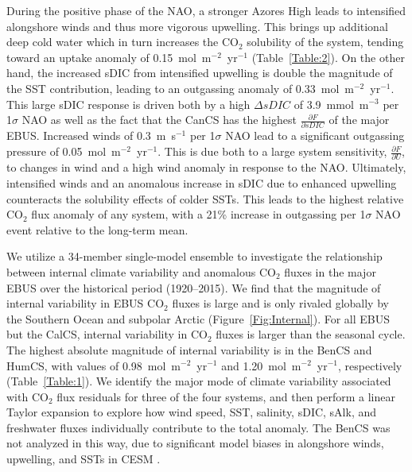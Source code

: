 \documentclass[hvmath, online,bgd]{copernicus_discussions}
\begin{document}
During the positive phase of the NAO, a stronger Azores High leads to intensified alongshore winds and thus more vigorous upwelling. This brings up additional deep cold water which in turn increases the CO$_{2}$ solubility of the system, tending toward an uptake anomaly of 0.15~mol~m$^{-2}$~yr$^{-1}$ (Table~\ref{Table:2}). On the other hand, the increased sDIC from intensified upwelling is double the magnitude of the SST contribution, leading to an outgassing anomaly of 0.33~mol~m$^{-2}$~yr$^{-1}$. This large sDIC response is driven both by a high $\Delta sDIC$ of 3.9~mmol~m$^{-3}$ per 1$\sigma$ NAO as well as the fact that the CanCS has the highest $\frac{\partial F}{\partial sDIC}$ of the major EBUS. Increased winds of 0.3~m~s$^{-1}$ per 1$\sigma$ NAO lead to a significant outgassing pressure of 0.05~mol~m$^{-2}$~yr$^{-1}$. This is due both to a large system sensitivity, $\frac{\partial F}{\partial U}$, to changes in wind and a high wind anomaly in response to the NAO. Ultimately, intensified winds and an anomalous increase in sDIC due to enhanced upwelling counteracts the solubility effects of colder SSTs. This leads to the highest relative CO$_{2}$ flux anomaly of any system, with a 21\% increase in outgassing per 1$\sigma$ NAO event relative to the long-term mean.

We utilize a 34-member single-model ensemble to investigate the relationship between internal climate variability and anomalous CO$_{2}$ fluxes in the major EBUS over the historical period (1920--2015). We find that the magnitude of internal variability in EBUS CO$_{2}$ fluxes is large and is only rivaled globally by the Southern Ocean and subpolar Arctic (Figure~\ref{Fig:Internal}). For all EBUS but the CalCS, internal variability in CO$_{2}$ fluxes is larger than the seasonal cycle. The highest absolute magnitude of internal variability is in the BenCS and HumCS, with values of 0.98~mol~m$^{-2}$~yr$^{-1}$ and 1.20~mol~m$^{-2}$~yr$^{-1}$, respectively (Table~\ref{Table:1}). We identify the major mode of climate variability associated with CO$_{2}$ flux residuals for three of the four systems, and then perform a linear Taylor expansion to explore how wind speed, SST, salinity, sDIC, sAlk, and freshwater fluxes individually contribute to the total anomaly. The BenCS was not analyzed in this way, due to significant model biases in alongshore winds, upwelling, and SSTs in CESM \citep{Small:2015}. 
\end{document}
